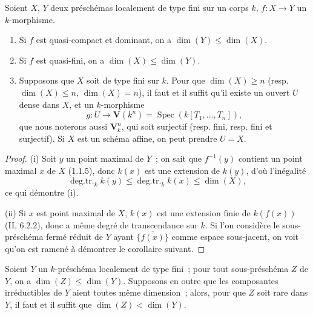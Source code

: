 \begin{theorem}[4.1.2]
\label{IV.2.4.1.2-fr}
Soient $X$, $Y$ deux préschémas localement de type fini sur un corps $k$,
$f:X\to Y$ un $k$-morphisme.


\begin{enumerate}
\item[(i)] Si $f$ est quasi-compact et dominant, on a
$\dim(Y)\leqslant\dim(X)$.
\item[(ii)] Si $f$ est quasi-fini, on a
$\dim(X)\leqslant\dim(Y)$.
\item[(iii)] Supposons que $X$ soit de type fini sur $k$. Pour que
$\dim(X)\geqslant n$ (resp. $\dim(X)\leqslant n$, $\dim(X)=n$), il faut et il
suffit qu'il existe un ouvert $U$ dense dans $X$, et un $k$-morphisme
\[
g:U\longrightarrow\mathbf V(k^n)
=\operatorname{Spec}(k[T_1,\ldots,T_n]),
\]
que nous noterons aussi $\mathbf V_k^n$, qui soit surjectif (resp. fini,
resp. fini et surjectif). Si $X$ est un schéma affine, on peut prendre $U=X$.
\end{enumerate}
\end{theorem}

\begin{proof}
(i) Soit $y$ un point maximal de $Y$~; on sait que $f^{-1}(y)$ contient un
point maximal $x$ de $X$ (1.1.5), donc $k(x)$ est une extension de $k(y)$,
d'où l'inégalité
\[
\operatorname{deg.tr.}_k k(y)
\leqslant\operatorname{deg.tr.}_k k(x)
\leqslant\dim(X),
\]
ce qui démontre (i).

(ii) Si $x$ est point maximal de $X$, $k(x)$ est une extension finie de
$k(f(x))$ (II, 6.2.2), donc a même degré de transcendance sur $k$. Si l'on
considère le sous-préschéma fermé réduit de $Y$ ayant $\overline{\{f(x)\}}$
comme espace sous-jacent, on voit qu'on est ramené à démontrer le corollaire
suivant.
\end{proof}

\begin{corollary}[4.1.2.1]
\label{IV.2.4.1.2.1-fr}
Soient $Y$ un $k$-préschéma localement de type fini~; pour tout sous-préschéma
$Z$ de $Y$, on a $\dim(Z)\leqslant\dim(Y)$. Supposons en outre que les
composantes irréductibles de $Y$ aient toutes même dimension~; alors, pour que
$Z$ soit rare dans $Y$, il faut et il suffit que
$\dim(Z)<\dim(Y)$.
\end{corollary}

